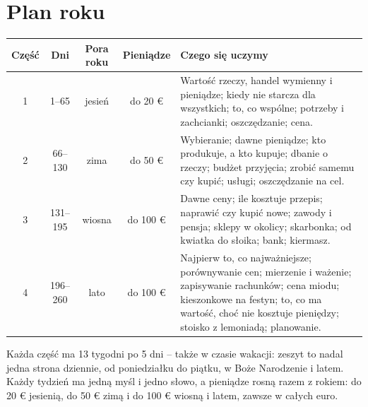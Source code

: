 \section*{Plan roku}

\begin{center}
\renewcommand{\arraystretch}{1.4}
\begin{tabularx}{\linewidth}{@{}c c c c X@{}}
\toprule
\textbf{Część} & \textbf{Dni} & \textbf{Pora roku} & \textbf{Pieniądze} & \textbf{Czego się uczymy} \\
\midrule
1 & 1--65 & jesień & do 20 € & Wartość rzeczy, handel wymienny i
pieniądze; kiedy nie starcza dla wszystkich; to, co wspólne; potrzeby i
zachcianki; oszczędzanie; cena. \\
2 & 66--130 & zima & do 50 € & Wybieranie; dawne pieniądze; kto
produkuje, a kto kupuje; dbanie o rzeczy; budżet przyjęcia; zrobić
samemu czy kupić; usługi; oszczędzanie na cel. \\
3 & 131--195 & wiosna & do 100 € & Dawne ceny; ile kosztuje przepis;
naprawić czy kupić nowe; zawody i pensja; sklepy w okolicy; skarbonka;
od kwiatka do słoika; bank; kiermasz. \\
4 & 196--260 & lato & do 100 € & Najpierw to, co najważniejsze;
porównywanie cen; mierzenie i ważenie; zapisywanie rachunków; cena
miodu; kieszonkowe na festyn; to, co ma wartość, choć nie kosztuje
pieniędzy; stoisko z lemoniadą; planowanie. \\
\bottomrule
\end{tabularx}
\end{center}

\vspace{6mm}
Każda część ma 13 tygodni po 5 dni -- także w czasie wakacji: zeszyt to
nadal jedna strona dziennie, od poniedziałku do piątku, w Boże
Narodzenie i latem. Każdy tydzień ma jedną myśl i jedno słowo, a
pieniądze rosną razem z rokiem: do 20 € jesienią, do 50 € zimą i do
100 € wiosną i latem, zawsze w całych euro.
\newpage
